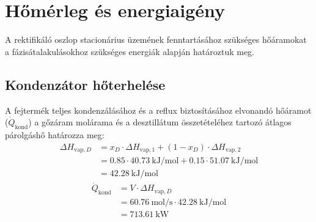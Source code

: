 \section{Hőmérleg és energiaigény}

A rektifikáló oszlop stacionárius üzemének fenntartásához szükséges
hőáramokat a fázisátalakulásokhoz szükséges energiák alapján határoztuk meg.

\subsection{Kondenzátor hőterhelése}
A fejtermék teljes kondenzálásához és a reflux biztosításához
elvonandó hőáramot ($\dot{Q}_{\text{kond}}$) a gőzáram molárama és a desztillátum
összetételéhez tartozó átlagos párolgáshő határozza meg:
\begin{equation}
  \begin{split}
    \Delta H_{\text{vap},D} &= x_D \cdot \Delta H_{\text{vap},1} + (1 - x_D) \cdot
    \Delta H_{\text{vap},2}\\
    &= \num{0.85} \cdot \qty{40.73}{\kilo\joule\per\mol} + \num{0.15} \cdot
    \qty{51.07}{\kilo\joule\per\mol}\\
    &= \qty{42.28}{\kilo\joule\per\mol}
  \end{split}
\end{equation}
\begin{equation}
  \begin{split}
    \dot{Q}_{\text{kond}} &= V \cdot \Delta H_{\text{vap},D}\\
    &= \qty{60.76}{\mol\per\second} \cdot \qty{42.28}{\kilo\joule\per\mol}\\
    &= \qty{713.61}{\kilo\watt}
  \end{split}
\end{equation}

